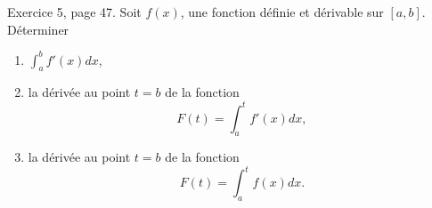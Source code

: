 \begin{exercice}\label{exo0020}

Exercice 5, page 47. Soit $f(x)$, une fonction définie et dérivable sur $[a,b]$. Déterminer
\begin{enumerate}

\item
$\int_a^bf'(x)dx$,

\item
la dérivée au point $t=b$ de la fonction
\begin{equation}
	F(t)=\int_a^tf'(x)dx,
\end{equation}

\item
la dérivée au point $t=b$ de la fonction
\begin{equation}
	F(t)=\int_a^tf(x)dx.
\end{equation}

\end{enumerate}


\end{exercice}
